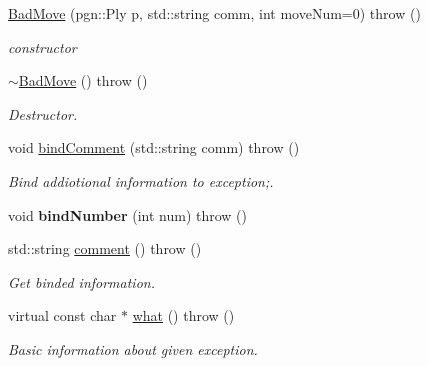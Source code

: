 \begin{DoxyCompactItemize}
\item 
\hyperlink{classChEngn_1_1BadMove_a581052f5203836b164bf25ce6e3e6b7a}{BadMove} (pgn::Ply p, std::string comm, int moveNum=0)  throw ()
\begin{DoxyCompactList}\small\item\em constructor \item\end{DoxyCompactList}\item 
\hypertarget{classChEngn_1_1BadMove_a6efb8ca7c4af455b042eddf7ebbf2837}{
\hyperlink{classChEngn_1_1BadMove_a6efb8ca7c4af455b042eddf7ebbf2837}{$\sim$BadMove} ()  throw ()}
\label{classChEngn_1_1BadMove_a6efb8ca7c4af455b042eddf7ebbf2837}

\begin{DoxyCompactList}\small\item\em Destructor. \item\end{DoxyCompactList}\item 
void \hyperlink{classChEngn_1_1BadMove_a0006497750a3d96218b1dad586f5f8f1}{bindComment} (std::string comm)  throw ()
\begin{DoxyCompactList}\small\item\em Bind addiotional information to exception;. \item\end{DoxyCompactList}\item 
\hypertarget{classChEngn_1_1BadMove_a1de119e2f1144a0e6906940df02bdaf8}{
void {\bfseries bindNumber} (int num)  throw ()}
\label{classChEngn_1_1BadMove_a1de119e2f1144a0e6906940df02bdaf8}

\item 
\hypertarget{classChEngn_1_1BadMove_a89df0bcb37e85792fd07e253503b4038}{
std::string \hyperlink{classChEngn_1_1BadMove_a89df0bcb37e85792fd07e253503b4038}{comment} ()  throw ()}
\label{classChEngn_1_1BadMove_a89df0bcb37e85792fd07e253503b4038}

\begin{DoxyCompactList}\small\item\em Get binded information. \item\end{DoxyCompactList}\item 
\hypertarget{classChEngn_1_1BadMove_ae7c3114036a9917a5aef4458a8f567d3}{
virtual const char $\ast$ \hyperlink{classChEngn_1_1BadMove_ae7c3114036a9917a5aef4458a8f567d3}{what} ()  throw ()}
\label{classChEngn_1_1BadMove_ae7c3114036a9917a5aef4458a8f567d3}

\begin{DoxyCompactList}\small\item\em Basic information about given exception. \item\end{DoxyCompactList}\end{DoxyCompactItemize}


